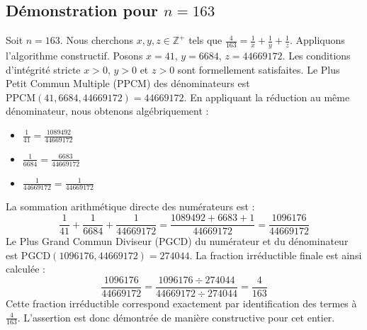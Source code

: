 \documentclass[11pt,a4paper]{article}
\begin{document}
\subsection{Démonstration pour $n = 163$}
Soit $n = 163$. Nous cherchons $x, y, z \in \mathbb{Z}^{+}$ tels que $\frac{4}{163} = \frac{1}{x} + \frac{1}{y} + \frac{1}{z}$.
Appliquons l'algorithme constructif. Posons $x = 41$, $y = 6684$, $z = 44669172$.
Les conditions d'intégrité stricte $x > 0$, $y > 0$ et $z > 0$ sont formellement satisfaites.
Le Plus Petit Commun Multiple (PPCM) des dénominateurs est $\text{PPCM}(41, 6684, 44669172) = 44669172$.
En appliquant la réduction au même dénominateur, nous obtenons algébriquement :
\begin{itemize}
    \item $\frac{1}{41} = \frac{1089492}{44669172}$
    \item $\frac{1}{6684} = \frac{6683}{44669172}$
    \item $\frac{1}{44669172} = \frac{1}{44669172}$
\end{itemize}
La sommation arithmétique directe des numérateurs est :
$$ \frac{1}{41} + \frac{1}{6684} + \frac{1}{44669172} = \frac{1089492 + 6683 + 1}{44669172} = \frac{1096176}{44669172} $$
Le Plus Grand Commun Diviseur (PGCD) du numérateur et du dénominateur est $\text{PGCD}(1096176, 44669172) = 274044$.
La fraction irréductible finale est ainsi calculée :
$$ \frac{1096176}{44669172} = \frac{1096176 \div 274044}{44669172 \div 274044} = \frac{4}{163} $$
Cette fraction irréductible correspond exactement par identification des termes à $\frac{4}{163}$. L'assertion est donc démontrée de manière constructive pour cet entier.
\end{document}
